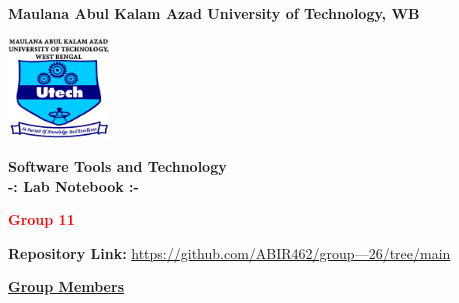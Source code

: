 \documentclass[a4paper,12pt]{article}
\begin{document}
\begin{titlepage}
    \centering
    \vspace*{0 cm}
    \LARGE
    \textbf{Maulana Abul Kalam Azad University of Technology, WB}
    \vspace{0.5cm}
    
    \includegraphics[width=0.2\textwidth]{makaut.png} %
    \vspace{0.5cm}
    
    \Large
    \textbf{\textcolor{blue!60}{Software Tools and Technology\\
        -: Lab Notebook :-}}
    \vspace{0.5cm}
    
    \large
    \textbf{\textcolor{red}{Group 11}}
    \vspace{1 cm}
    
    \textbf{Repository Link:} \href{https://github.com/Rajarshi-2005/LaTeX-Group-11}{https://github.com/ABIR462/group---26/tree/main}
    \vspace{1cm}
    
    \textbf{\underline{\textcolor{blue!60}{Group Members}}}
    \vspace{0.5cm}


\end{titlepage}
\end{document}
